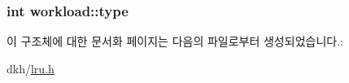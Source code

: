 \hypertarget{structworkload_aa2845ad1d10cf7ef276771aa7c038c40}{
\subsubsection[{type}]{\setlength{\rightskip}{0pt plus 5cm}int workload\+::type}}\label{structworkload_aa2845ad1d10cf7ef276771aa7c038c40}


이 구조체에 대한 문서화 페이지는 다음의 파일로부터 생성되었습니다.\+:\begin{DoxyCompactItemize}
\item 
dkh/\hyperlink{lru_8h}{lru.\+h}\end{DoxyCompactItemize}

